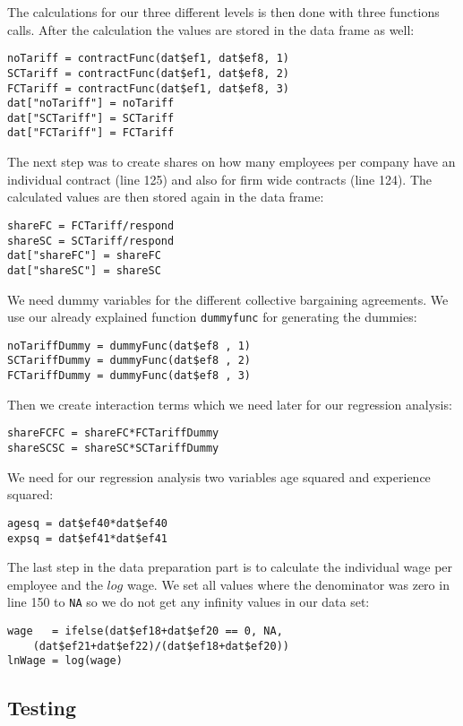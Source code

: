 The calculations for our three different levels is then done with three functions calls. After the calculation the values are stored in the data frame as well:
\lstset{firstnumber = 116}
\begin{lstlisting}
noTariff = contractFunc(dat$ef1, dat$ef8, 1)
SCTariff = contractFunc(dat$ef1, dat$ef8, 2)
FCTariff = contractFunc(dat$ef1, dat$ef8, 3) 
dat["noTariff"] = noTariff                
dat["SCTariff"] = SCTariff
dat["FCTariff"] = FCTariff
\end{lstlisting}
The next step was to create shares on how many employees per company have an individual contract (line 125) and also for firm wide contracts (line 124). The calculated values are then stored again in the data frame:
\lstset{firstnumber = 124}
\begin{lstlisting}
shareFC = FCTariff/respond
shareSC = SCTariff/respond
dat["shareFC"] = shareFC            
dat["shareSC"] = shareSC
\end{lstlisting}
We need dummy variables for the different collective bargaining agreements. We use our already explained function \texttt{dummyfunc} for generating the dummies:
\lstset{firstnumber = 130}
\begin{lstlisting}
noTariffDummy = dummyFunc(dat$ef8 , 1)
SCTariffDummy = dummyFunc(dat$ef8 , 2)
FCTariffDummy = dummyFunc(dat$ef8 , 3)
\end{lstlisting}
Then we create interaction terms which we need later for our regression analysis:
\lstset{firstnumber = 138}
\begin{lstlisting}
shareFCFC = shareFC*FCTariffDummy
shareSCSC = shareSC*SCTariffDummy
\end{lstlisting}
We need for our regression analysis two variables age squared and experience squared:
\lstset{firstnumber = 144}
\begin{lstlisting}
agesq = dat$ef40*dat$ef40
expsq = dat$ef41*dat$ef41
\end{lstlisting}
The last step in the data preparation part is to calculate the individual wage per employee and the $log$ wage. We set all values where the denominator was zero in line 150 to \texttt{NA} so we do not get any infinity values in our data set:
\lstset{firstnumber = 150}
\begin{lstlisting}
wage   = ifelse(dat$ef18+dat$ef20 == 0, NA, 
	(dat$ef21+dat$ef22)/(dat$ef18+dat$ef20))
lnWage = log(wage)
\end{lstlisting}

\subsection{Testing}

